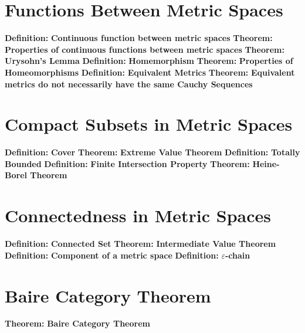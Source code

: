 \documentclass[14pt]{extarticle}
\def\Definition{{\color{Blue} \textbf{Definition:} }}
\def\Theorem{{\color{Red} \textbf{Theorem:} }}
\begin{document}
\begin{outline}
		\section{Functions Between Metric Spaces}
		\1	\Definition \textbf{Continuous function between metric spaces}	
		\1	\Theorem	\textbf{Properties of continuous functions between metric spaces}
		\1	\Theorem	\textbf{Urysohn's Lemma}
		\1	\Definition \textbf{Homemorphism}
		\1	\Theorem	\textbf{Properties of Homeomorphisms}
		\1	\Definition \textbf{Equivalent Metrics}
		\1	\Theorem \textbf{Equivalent metrics do not necessarily have the same Cauchy Sequences}
		\section{Compact Subsets in Metric Spaces}
		\1	\Definition \textbf{Cover}
		\1	\Theorem	\textbf{Extreme Value Theorem}
		\1	\Definition \textbf{Totally Bounded}
		\1	\Definition \textbf{Finite Intersection Property}
		\1	\Theorem	\textbf{Heine-Borel Theorem}
		\section{Connectedness in Metric Spaces}
		\1	\Definition \textbf{Connected Set}
		\1	\Theorem \textbf{Intermediate Value Theorem}
		\1	\Definition \textbf{Component of a metric space}
		\1	\Definition \textbf{$\varepsilon$-chain}
		\section{Baire Category Theorem}
		\1	\Theorem	\textbf{Baire Category Theorem}

	\end{outline}
\end{document}
